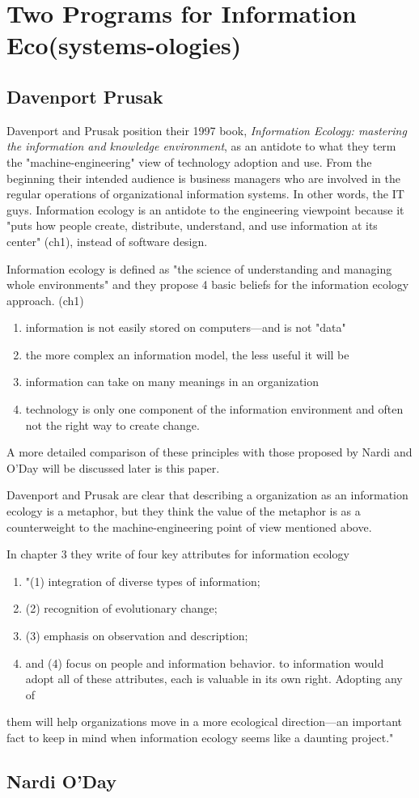 \section{Two Programs for Information Eco(systems-ologies)}

\subsection{Davenport Prusak}

Davenport and Prusak position their 1997 book, \textit{Information Ecology: mastering the information and knowledge environment}, as an antidote to what they term the "machine-engineering" view of technology adoption and use. From the beginning their intended audience is business managers who are involved in the regular operations of organizational information systems. In other words, the IT guys. Information ecology is an antidote to the engineering viewpoint because it "puts how people create, distribute, understand, and use information at its center" (ch1), instead of software design.

Information ecology is defined as "the science of understanding and managing whole environments" and they propose 4 basic beliefs for the information ecology approach. (ch1)
\begin{enumerate}
\item information is not easily stored on computers—and is not "data"
\item the more complex an information model, the less useful it will be
\item information can take on many meanings in an organization
\item technology is only one component of the information environment and often not the right way to create change.
\end{enumerate}

A more detailed comparison of these principles with those proposed by Nardi and O'Day will be discussed later is this paper.

Davenport and Prusak are clear that describing a organization as an information ecology is a metaphor, but they think the value of the metaphor is as a counterweight to the machine-engineering point of view mentioned above.

In chapter 3 they write of four key attributes for information ecology

\begin{enumerate}
\item "(1) integration of diverse types of information;
\item (2) recognition of evolutionary change;
\item (3) emphasis on observation and description;
\item and (4) focus on people and information behavior. to information would adopt all of these attributes, each is valuable in its own right. Adopting any of
\end{enumerate}
 them will help organizations move in a more ecological direction—an important fact to keep in mind when information ecology seems like a daunting project."



\subsection{Nardi O'Day}
